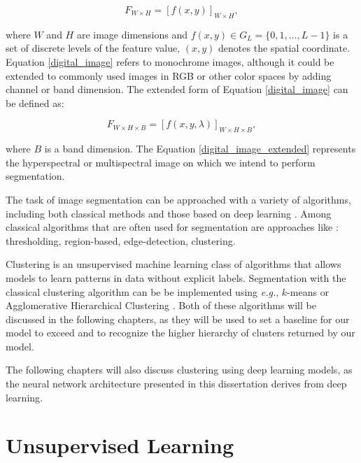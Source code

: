 \documentclass[a4paper,12pt]{article}
\begin{document}
\begin{equation}\label{digital_image}
    F_{W \times H}=[f(x,y)]_{W \times H},
\end{equation}

\noindent where $W$ and $H$ are image dimensions and $f(x,y) \in G_{L}=\{0,1, \ldots, L-1\}$ is a set of discrete levels of the feature value, $(x,y)$ denotes the spatial coordinate. Equation \eqref{digital_image} refers to monochrome images, although it could be extended to commonly used images in RGB or other color spaces by adding channel or band dimension. The extended form of Equation \eqref{digital_image} can be defined as:

\begin{equation}\label{digital_image_extended}
    F_{W \times H \times B}=[f(x,y,\lambda)]_{W \times H \times B},
\end{equation}

\noindent where $B$ is a band dimension. The Equation \eqref{digital_image_extended} represents the hyperspectral or multispectral image on which we intend to perform segmentation.

The task of image segmentation can be approached with a variety of algorithms, including both classical methods \cite{Chen2017} and those based on deep learning \cite{Badrinarayanan2017}. Among classical algorithms that are often used for segmentation are approaches like \cite{Chen2017}: thresholding, region-based, edge-detection, clustering.

Clustering is an unsupervised machine learning class of algorithms that allows models to learn patterns in data without explicit labels. Segmentation with the classical clustering algorithm can be be implemented using \textit{e.g.}, $k$-means \cite{Dhanachandra2015} or Agglomerative Hierarchical Clustering \cite{Mohanta2002}. Both of these algorithms will be discussed in the following chapters, as they will be used to set a baseline for our model to exceed and to recognize the higher hierarchy of clusters returned by our model.

The following chapters will also discuss clustering using deep learning models, as the neural network architecture presented in this dissertation derives from deep learning.

\section{Unsupervised Learning}\label{unsupervised_learning}
\end{document}
